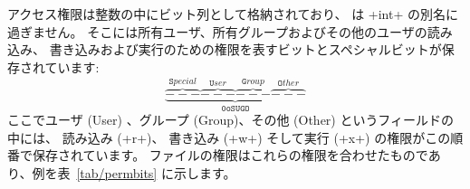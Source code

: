 アクセス権限は整数の中にビット列として格納されており、
 は \ml+int+ の別名に過ぎません。
そこには所有ユーザ、所有グループおよびその他のユーザの読み込み、
書き込みおよび実行のための権限を表すビットとスペシャルビットが保存されています:
%
{%
\begin{displaymath}
\underbrace
{\overbrace{---}^{\texttt Special}
 \overbrace{---}^{\texttt User}
 \overbrace{---}^{\texttt Group}
 \overbrace{---}^{\texttt Other}}_{\texttt{0oSUGO}}
\end{displaymath}
}
%
ここでユーザ (User) 、グループ (Group)、その他 (Other) というフィールドの中には、
読み込み (\ml+r+)、 書き込み (\ml+w+) そして実行 (\ml+x+) の権限がこの順番で保存されています。
ファイルの権限はこれらの権限を合わせたものであり、例を表~\ref{tab/permbits} に示します。
